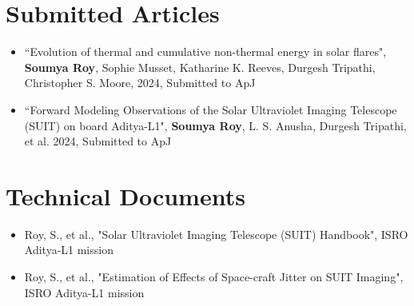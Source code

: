 \section*{Submitted Articles}

\begin{itemize}
    \item ``Evolution of thermal and cumulative non-thermal energy in solar flares", {\bf Soumya Roy}, Sophie Musset, Katharine K. Reeves, Durgesh Tripathi, Christopher S. Moore, 2024, Submitted to ApJ\footnotemark[1]{}
    \item ``Forward Modeling Observations of the Solar Ultraviolet Imaging Telescope (SUIT) on board Aditya-L1", {\bf Soumya Roy}, L. S. Anusha, Durgesh Tripathi, et al. 2024, Submitted to ApJ\footnotemark[1]{}
\end{itemize}

\section*{Technical Documents}

\begin{itemize}
    \item Roy, S., et al., "Solar Ultraviolet Imaging Telescope (SUIT) Handbook", ISRO Aditya-L1 mission
    \item Roy, S., et al., "Estimation of Effects of Space-craft Jitter on SUIT Imaging", ISRO Aditya-L1 mission\footnotemark[1]{}
\end{itemize}
